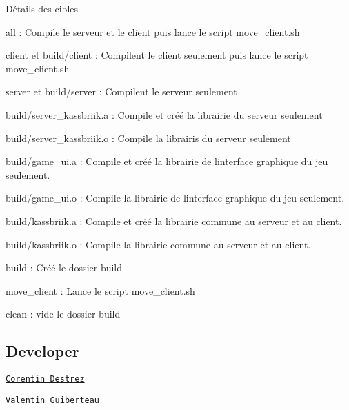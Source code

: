 Détails des cibles
\begin{DoxyItemize}
\item all \+: Compile le serveur et le client puis lance le script move\+\_\+client.\+sh
\item client et build/client \+: Compilent le client seulement puis lance le script move\+\_\+client.\+sh
\item server et build/server \+: Compilent le serveur seulement
\item build/server\+\_\+kassbriik.\+a \+: Compile et créé la librairie du serveur seulement
\item build/server\+\_\+kassbriik.\+o \+: Compile la librairis du serveur seulement
\item build/game\+\_\+ui.\+a \+: Compile et créé la librairie de l\textquotesingle{}interface graphique du jeu seulement.
\item build/game\+\_\+ui.\+o \+: Compile la librairie de l\textquotesingle{}interface graphique du jeu seulement.
\item build/kassbriik.\+a \+: Compile et créé la librairie commune au serveur et au client.
\item build/kassbriik.\+o \+: Compile la librairie commune au serveur et au client.
\item build \+: Créé le dossier build
\item move\+\_\+client \+: Lance le script move\+\_\+client.\+sh
\item clean \+: vide le dossier build
\end{DoxyItemize}

\subsection*{Developer}

\href{https://github.com/Lafie-rage}{\tt Corentin Destrez}

\href{https://github.com/ValentinIG2I}{\tt Valentin Guiberteau}

 